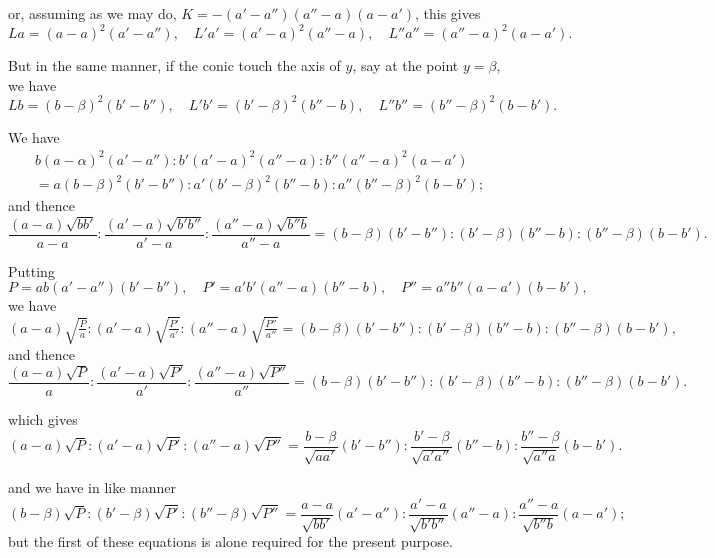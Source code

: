 \documentclass[11pt,a4paper]{article}
\theoremstyle{plain}
\begin{document}
\newpage
\setcounter{equation}{4}

or, assuming as we may do, $K = -(a'-a'')(a''-a)(a-a')$,
this gives
\begin{equation}
La = (a-a)^2(a'-a''), \quad L'a' = (a'-a)^2(a''-a), \quad L''a'' = (a''-a)^2(a-a').
\end{equation}

But in the same manner, if the conic touch the axis of $y$, say at the point $y = \beta$, we have
\begin{equation}
Lb = (b-\beta)^2(b'-b''), \quad L'b' = (b'-\beta)^2(b''-b), \quad L''b'' = (b''-\beta)^2(b-b').
\end{equation}

We have
\begin{multline}
b(a-\alpha)^2(a'-a'') : b'(a'-a)^2(a''-a) : b''(a''-a)^2(a-a') \\
= a(b-\beta)^2(b'-b'') : a'(b'-\beta)^2(b''-b) : a''(b''-\beta)^2(b-b');
\end{multline}
and thence
\begin{equation}
\frac{(a-a)\sqrt{bb'}}{a-a} : \frac{(a'-a)\sqrt{b'b''}}{a'-a} : \frac{(a''-a)\sqrt{b''b}}{a''-a} = (b-\beta)(b'-b'') : (b'-\beta)(b''-b) : (b''-\beta)(b-b').
\end{equation}

Putting
\begin{equation}
P = ab(a'-a'')(b'-b''), \quad P' = a'b'(a''-a)(b''-b), \quad P'' = a''b''(a-a')(b-b'),
\end{equation}
we have
\begin{equation}
(a-a)\sqrt{\tfrac{P}{a}} : (a'-a)\sqrt{\tfrac{P'}{a'}} : (a''-a)\sqrt{\tfrac{P''}{a''}} = (b-\beta)(b'-b'') : (b'-\beta)(b''-b) : (b''-\beta)(b-b'),
\end{equation}
and thence
\begin{equation}
\frac{(a-a)\sqrt{P}}{a} : \frac{(a'-a)\sqrt{P'}}{a'} : \frac{(a''-a)\sqrt{P''}}{a''} = (b-\beta)(b'-b'') : (b'-\beta)(b''-b) : (b''-\beta)(b-b').
\end{equation}

which gives
\begin{equation}
(a-a)\sqrt{P} : (a'-a)\sqrt{P'} : (a''-a)\sqrt{P''} = \frac{b-\beta}{\sqrt{aa'}}(b'-b'') : \frac{b'-\beta}{\sqrt{a'a''}}(b''-b) : \frac{b''-\beta}{\sqrt{a''a}}(b-b').
\end{equation}

and we have in like manner
\begin{equation}
(b-\beta)\sqrt{P} : (b'-\beta)\sqrt{P'} : (b''-\beta)\sqrt{P''} = \frac{a-a}{\sqrt{bb'}}(a'-a'') : \frac{a'-a}{\sqrt{b'b''}}(a''-a) : \frac{a''-a}{\sqrt{b''b}}(a-a');
\end{equation}
but the first of these equations is alone required for the present purpose.
\end{document}
